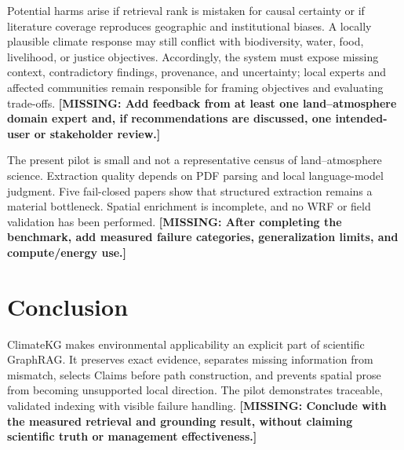 \documentclass{article}
\newcommand{\missing}[1]{\textcolor{missingred}{\textbf{[MISSING: #1]}}}
\newcommand{\system}{ClimateKG}
\begin{document}
Potential harms arise if retrieval rank is mistaken for causal certainty or if
literature coverage reproduces geographic and institutional biases. A locally
plausible climate response may still conflict with biodiversity, water, food,
livelihood, or justice objectives. Accordingly, the system must expose missing
context, contradictory findings, provenance, and uncertainty; local experts and
affected communities remain responsible for framing objectives and evaluating
trade-offs. \missing{Add feedback from at least one land--atmosphere domain
expert and, if recommendations are discussed, one intended-user or stakeholder
review.}

The present pilot is small and not a representative census of land--atmosphere
science. Extraction quality depends on PDF parsing and local language-model
judgment. Five fail-closed papers show that structured extraction remains a
material bottleneck. Spatial enrichment is incomplete, and no WRF or field
validation has been performed. \missing{After completing the benchmark, add
measured failure categories, generalization limits, and compute/energy use.}

\section{Conclusion}

\system{} makes environmental applicability an explicit part of scientific
GraphRAG. It preserves exact evidence, separates missing information from
mismatch, selects Claims before path construction, and prevents spatial prose
from becoming unsupported local direction. The pilot demonstrates traceable,
validated indexing with visible failure handling. \missing{Conclude with the
measured retrieval and grounding result, without claiming scientific truth or
management effectiveness.}



\end{document}
